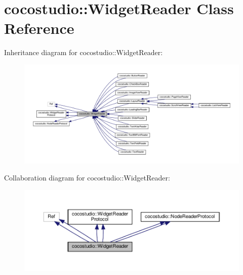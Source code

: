 \hypertarget{classcocostudio_1_1WidgetReader}{}\section{cocostudio\+:\+:Widget\+Reader Class Reference}
\label{classcocostudio_1_1WidgetReader}


Inheritance diagram for cocostudio\+:\+:Widget\+Reader\+:
\nopagebreak
\begin{figure}[H]
\begin{center}
\leavevmode
\includegraphics[width=350pt]{classcocostudio_1_1WidgetReader__inherit__graph}
\end{center}
\end{figure}


Collaboration diagram for cocostudio\+:\+:Widget\+Reader\+:
\nopagebreak
\begin{figure}[H]
\begin{center}
\leavevmode
\includegraphics[width=350pt]{classcocostudio_1_1WidgetReader__coll__graph}
\end{center}
\end{figure}
